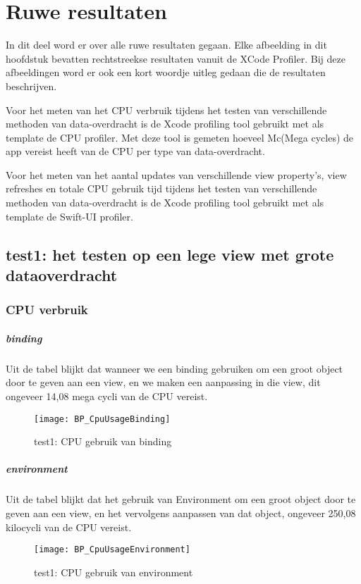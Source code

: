 \chapter{Ruwe resultaten}
In dit deel word er over alle ruwe resultaten gegaan. Elke afbeelding in dit hoofdstuk bevatten rechtstreekse resultaten vanuit de XCode Profiler. Bij deze afbeeldingen word er ook een kort woordje uitleg gedaan die de resultaten beschrijven.

Voor het meten van het CPU verbruik tijdens het testen van verschillende methoden van data-overdracht is de Xcode profiling tool gebruikt met als template de CPU profiler. Met deze tool is gemeten hoeveel Mc(Mega cycles) de app vereist heeft van de CPU per type van data-overdracht. 

Voor het meten van het aantal updates van verschillende view property's, view refreshes en totale CPU gebruik tijd tijdens het testen van verschillende methoden van data-overdracht is de Xcode profiling tool gebruikt met als template de Swift-UI profiler. 

\section{test1: het testen op een lege view met grote dataoverdracht}
\subsection{CPU verbruik}

\paragraph{binding}
Uit de tabel blijkt dat wanneer we een binding gebruiken om een groot object door te geven aan een view, en we maken een aanpassing in die view, dit ongeveer 14,08 mega cycli van de CPU vereist.
\begin{figure}[htbp]
    \centering
    \texttt{[image: BP\_CpuUsageBinding]} 
    \caption{test1: CPU gebruik van binding}
    \label{fig:cpuBinding}
\end{figure}

\paragraph{environment}
Uit de tabel blijkt dat het gebruik van Environment om een groot object door te geven aan een view, en het vervolgens aanpassen van dat object, ongeveer 250,08 kilocycli van de CPU vereist.
\begin{figure}[htbp]
    \centering
    \texttt{[image: BP\_CpuUsageEnvironment]} 
    \caption{test1: CPU gebruik van environment}
    \label{fig:cpuEnvironment}
\end{figure}


